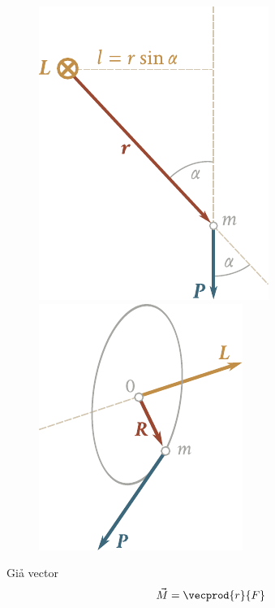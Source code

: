 \begin{figure}[!htb]
	\begin{minipage}[t]{0.5\linewidth}
		\begin{center}
			\includegraphics[scale=0.95]{figures/ch_03/fig_3_18.pdf}
			\caption[]{}
			\label{fig:3_18}
		\end{center}
	\end{minipage}
	\hspace{-0.05cm}
	\begin{minipage}[t]{0.5\linewidth}
		\begin{center}
			\includegraphics[scale=0.95]{figures/ch_03/fig_3_19.pdf}
			\caption[]{}
			\label{fig:3_19}
		\end{center}
	\end{minipage}
\end{figure}

Giả vector
\begin{equation}\label{eq:3_112}
\vec{M} = \vecprod{r}{F}
\end{equation}

